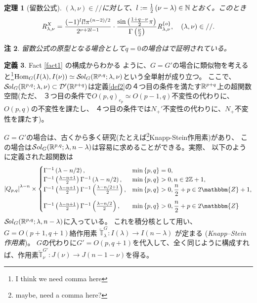 \documentclass[12pt]{article} %
\newcommand{\Hom}{\mbox{\normalfont Hom}}
\newcommand{\Sol}{\mathcal{S}\!{\it ol}}
\newtheorem{theorem}{定理}
\newtheorem{remark}[theorem]{注}
\theoremstyle{definition}
\newtheorem{definition}[theorem]{定義}
\theoremstyle{exampstyle} \newtheorem{examp}[theorem]{Theorem}
\newcommand{\OpR}{\mbox{\it R}}
\renewcommand{\Q}{Q_{p,q}}
\newcommand{\doubt}[1]{\uwave{#1}}
\begin{document}
\begin{theorem}[留数公式]
	$(\lambda,\nu)\in//$に対して、$l:=\frac{1}{2}\left( \nu-\lambda \right)\in\mathbb{N}$とおく。このとき
  \[\OpR_{\lambda,\nu}^X  = \frac{ (- 1)^l l!\pi^{(n - 2) / 2} 
		}{2^{ \nu + 2 l-1}}\cdot  \frac{\sin\left( \frac{1+q-\nu}{2}\pi \right)}{\Gamma\left( \frac{\nu}{2} \right)}
     \OpR_{\lambda,\nu}^{ \left\{ o \right\} },\quad(\lambda,\nu)\in// . \]
	\end{theorem}
	\begin{remark}
		留数公式の原型となる場合として$q=0$の場合は\cite{KOBAYASHI2014272}\cite[Thm. 12.2]{kobayashi2015symmetry}で証明されている。
	\end{remark}
	\begin{definition}
		Fact \ref{fact1}
		の構成からわかる
		ように、$G=G'$の場合に類似物を考えると\footnote{I think we need comma here}$\Hom_G(I(\lambda),I(\nu))\simeq\Sol_G(\R^{p,q};\lambda,\nu)$という全単射が成り立つ。
		ここで、\;$\Sol_G(\R^{p,q};\lambda,\nu)\subset\mathcal{D}'(\R^{p+q})$は定義\ref{def2}の４つ目の条件を満たす$\mathbb{R}^{p+q}$上の超関数空間(ただ、
		３つ目の条件で$O(p,q)_{e_p}\simeq O(p-1,q)$\doubt{にする}不変性の代わりに、$O(p,q)$の不変性を課たし、
		４つ目の条件では$N_+'$不変性の代わりに、$N_+$不変性を課たす)。

		$G=G'$の場合は、古くから多く研究(たとえば\footnote{maybe, need a comma here?}Knapp-Stein作用素)があり、
		この場合は$\mathcal{S}ol_G(\mathbb{R}^{p,q};\lambda,n-\lambda)$は容易に求めることができる。実際、
		以下のように定義された超関数は
		\begin{equation*}
			\myabs{\Q}^{\lambda-n}\times\begin{cases}
				\Gamma^{-1}\left( \lambda-n/2 \right),&\min\left\{ p,q \right\}=0,\\
				\Gamma^{-1}\left( \frac{\lambda-n+1}{2} \right)\Gamma^{-1}\left( \lambda-n/2 \right),&\min\left\{ p,q \right\}>0,n\in2\Z+1,\\
  \Gamma^{-1} \left( \frac{\lambda-n + 1}{2} \right) \Gamma ^{-1}\left( \frac{\lambda-n/2+
  1}{2} \right), &\min\left\{ p,q \right\}>0, \frac{n}{2} + p \in 2\mathbbm{Z}+ 1,\\[10pt]
  \Gamma^{-1} \left( \frac{\lambda-n + 1}{2} \right) \Gamma ^{-1}\left( \frac{\lambda-n/2}{2}
  \right), & \min\left\{ p,q \right\}>0,\frac{n}{2} + p \in 2\mathbbm{Z}
			\end{cases}
		\end{equation*}
		$\Sol_G(\R^{p,q};\lambda,n-\lambda)$に入っている。
		これを積分核として用い、$G=O(p+1,q+1)$絡作用素
		$\tilde{\mathbb{T}}^{G}_{\lambda}:I(\lambda)\to
		I(n-\lambda)$
		が定まる
		(\textit{Knapp--Stein 作用素})。
		$G$の代わりに$G'=O(p,q+1)$を代入して、全く同じように構成すれば、作用素$\tilde{\mathbb{T}}^{G'}_\nu:J(\nu)\to J(n-1-\nu)$を得る。
	\end{definition}
\end{document}
